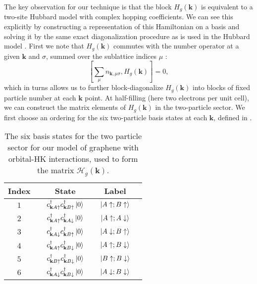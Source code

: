 \documentclass[prb,aps,amssymb,twocolumn,notitlepage]{revtex4-2}
\begin{document}
The key observation for our technique is that the block $H_{g}(\mathbf{k})$ is equivalent to a two-site Hubbard model with complex hopping coefficients. 
We can see this explicitly by constructing a representation of this Hamiltonian on a basis and solving it by the same exact diagonalization procedure as is used in the Hubbard model \cite{2008JafaritwositeHubbard}.
First we note that $H_{g}(\mathbf{k})$ commutes with the number operator at a given $\mathbf{k}$ and $\sigma$, summed over the sublattice indices $\mu$ :
\begin{equation}
    \left[\sum_{\mu}n_{\mathbf{k},\mu\sigma},H_{g}(\mathbf{k})\right]=0,
\end{equation}
which in turns allows us to further block-diagonalize $H_{g}(\mathbf{k})$ into blocks of fixed particle number at each $\mathbf{k}$ point. 
At half-filling (here two electrons per unit cell), we can construct the matrix elements of $H_g(\mathbf{k})$ in the two-particle sector. 
We first choose an ordering for the six two-particle basis states at each $\mathbf{k}$, defined in .
\begin{table}[ht]
\caption{The six basis states for the two particle sector for our model of graphene with orbital-HK interactions, used to form the matrix $\mathcal{H}_{g}(\mathbf{k})$.} %
\centering %
\renewcommand*{\arraystretch}{1.4}
\begin{tabular}{c c c c c c} %
\hline\hline %
Index & & State & & Label &\\[0.5ex]
\hline %
$1$ & &$c^\dagger_{\mathbf{k}A\uparrow}c^\dagger_{\mathbf{k}B\uparrow}\ket{0}$ & & $\ket{A\uparrow;B\uparrow}$& \\
$2$ & &$c^\dagger_{\mathbf{k}A\uparrow}c^\dagger_{\mathbf{k}A\downarrow}\ket{0}$ & & $\ket{A\uparrow;A\downarrow}$& \\
$3$ & &$c^\dagger_{\mathbf{k}A\downarrow}c^\dagger_{\mathbf{k}B\uparrow}\ket{0}$ & & $\ket{A\downarrow;B\uparrow}$& \\
$4$ & &$c^\dagger_{\mathbf{k}A\uparrow}c^\dagger_{\mathbf{k}B\downarrow}\ket{0}$ & & $\ket{A\uparrow;B\downarrow}$& \\
$5$ & &$c^\dagger_{\mathbf{k}B\uparrow}c^\dagger_{\mathbf{k}B\downarrow}\ket{0}$ & & $\ket{B\uparrow;B\downarrow}$& \\
$6$ & &$c^\dagger_{\mathbf{k}A\downarrow}c^\dagger_{\mathbf{k}B\downarrow}\ket{0}$ & & $\ket{A\downarrow;B\downarrow}$& \\

\hline %
\end{tabular}
\label{table:HKKMbasis} %
\end{table}
\end{document}
